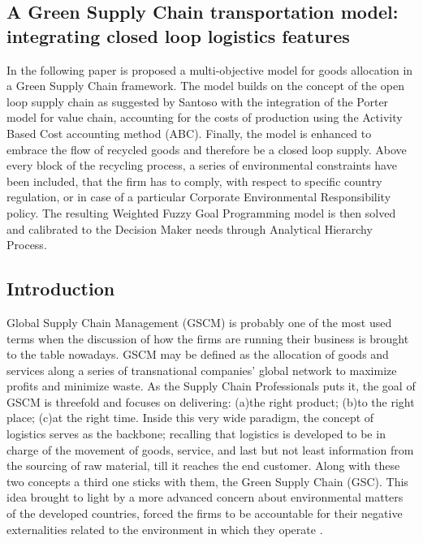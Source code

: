 \begin{doublespace}
\chapter{A Green Supply Chain transportation model: integrating closed loop logistics features}
In the following paper is proposed a multi-objective model for goods allocation in a Green Supply Chain framework. The model builds on the concept of the open loop supply chain as suggested by Santoso with the integration of the Porter model for value chain, accounting for the costs of production using the Activity Based Cost accounting method (ABC). Finally, the model is enhanced to embrace the flow of recycled goods and therefore be a closed loop supply. Above every block of the recycling process, a series of environmental constraints have been included, that the firm has to comply, with respect to specific country regulation, or in case of a particular Corporate Environmental Responsibility policy. The resulting Weighted Fuzzy Goal Programming model is then solved and calibrated to the Decision Maker needs through Analytical Hierarchy Process.

\section{Introduction}
  Global Supply Chain Management (GSCM) is probably one of the most used terms when the discussion of how the firms are running their business is brought to the table nowadays. GSCM may be defined as the allocation of goods and services along a series of transnational companies' global network to maximize profits and minimize waste. As the Supply Chain Professionals puts it, the goal of GSCM is threefold and focuses on delivering: (a)the right product; (b)to the right place; (c)at the right time.
   Inside this very wide paradigm, the concept of logistics serves as the backbone; recalling that logistics is developed to be in charge of the movement of goods, service, and last but not least information from the sourcing of raw material, till it reaches the end customer.
  Along with these two concepts a third one sticks with them, the Green Supply Chain (GSC). This idea brought to light by a more advanced concern about environmental matters of the developed countries, forced the firms to be accountable for their negative externalities related to the environment in which they operate \cite{Srivastava2007}.


\end{doublespace}
